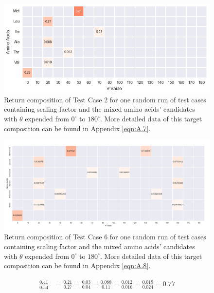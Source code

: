 \begin{figure}[!ht] 
\centering
\includegraphics[scale=0.9]{Figures/chapter6_figure_three.png}
\caption{Return composition of Test Case 2 for one random run of test cases containing scaling factor and the mixed amino acids' candidates with $\theta$ expended from $0^{\circ}$ to $180^{\circ}$. More detailed data of this target composition can be found in Appendix \ref{eqn:A.7}.} \label{fig:6.5}
\end{figure}

\begin{figure}[!ht] 
\centering
\includegraphics[scale=0.9]{Figures/chapter6_figure_four.png}
\caption{Return composition of Test Case 6 for one random run of test cases containing scaling factor and the mixed amino acids' candidates with $\theta$ expended from $0^{\circ}$ to $180^{\circ}$. More detailed data of this target composition can be found in Appendix \ref{eqn:A.8}.} \label{fig:6.6}
\end{figure}

\begin{eqnarray} 
\begin{split}
\frac{0.41}{0.54} &= \frac{0.21}{0.27} = \frac{0.03}{0.04}  =\frac{0.088}{0.11} = \frac{0.012}{0.016} = \frac{0.019}{0.024} = 0.77
\end{split}\label{eqn:6.2}
\end{eqnarray}

